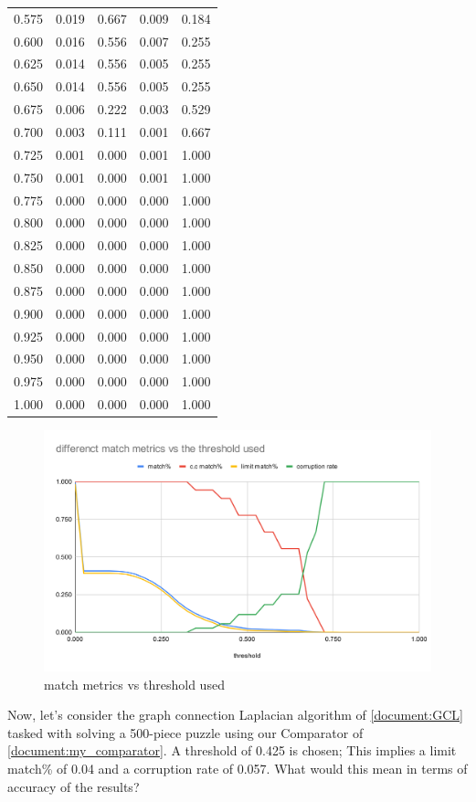 \documentclass{article}
\begin{document}
\begin{table}[H]
\begin{tabular}{
  >{\columncolor[HTML]{FFE599}}c 
  >{\columncolor[HTML]{B6D7A8}}c 
  >{\columncolor[HTML]{9FC5E8}}c 
  >{\columncolor[HTML]{F9CB9C}}c 
  >{\columncolor[HTML]{D9D2E9}}c }
  0.575 & 0.019 & 0.667 & 0.009 & 0.184 \\
  0.600 & 0.016 & 0.556 & 0.007 & 0.255 \\
  0.625 & 0.014 & 0.556 & 0.005 & 0.255 \\
  0.650 & 0.014 & 0.556 & 0.005 & 0.255 \\
  0.675 & 0.006 & 0.222 & 0.003 & 0.529 \\
  0.700 & 0.003 & 0.111 & 0.001 & 0.667 \\
  0.725 & 0.001 & 0.000 & 0.001 & 1.000 \\
  0.750 & 0.001 & 0.000 & 0.001 & 1.000 \\
  0.775 & 0.000 & 0.000 & 0.000 & 1.000 \\
  0.800 & 0.000 & 0.000 & 0.000 & 1.000 \\
  0.825 & 0.000 & 0.000 & 0.000 & 1.000 \\
  0.850 & 0.000 & 0.000 & 0.000 & 1.000 \\
  0.875 & 0.000 & 0.000 & 0.000 & 1.000 \\
  0.900 & 0.000 & 0.000 & 0.000 & 1.000 \\
  0.925 & 0.000 & 0.000 & 0.000 & 1.000 \\
  0.950 & 0.000 & 0.000 & 0.000 & 1.000 \\
  0.975 & 0.000 & 0.000 & 0.000 & 1.000 \\
  1.000 & 0.000 & 0.000 & 0.000 & 1.000
  \end{tabular}
  \end{table}


\begin{figure}[H]
    \caption{match metrics vs threshold used}\label{fig:match_metrics_vs_threshold_used}
    \centering
    \includegraphics[height=0.5\textwidth]{pictures/match_metrics_vs_threshold_used.png}
\end{figure}

Now, let's consider the graph connection Laplacian algorithm of \cref{document:GCL} tasked with solving a 500-piece puzzle
using our Comparator of \cref{document:my_comparator}.
A threshold of 0.425 is chosen;
This implies a limit match\% of 0.04 and a corruption rate of 0.057.
What would this mean in terms of accuracy of the results?
\end{document}
